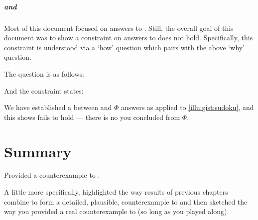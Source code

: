 \subparagraph{\qHow{} and \issueInclusion{}}


\begin{note}
  Most of this document focused on answers to \qWhy{}.
  Still, the overall goal of this document was to show a constraint on answers to \qWhy{} does not hold.
  Specifically, this constraint is understood via a `how' question which pairs with the above `why' question.

  The \qHow{} question is as follows:


  \noindent%
  And the constraint states:

\end{note}


\begin{note}
  We have established a \ros{} between \sudokuRPV{} and \(\Phi\) answers \qWhy{} as applied to \autoref{illu:gist:sudoku}, and this \ros{} shows \issueInclusion{} fails to hold --- there is no  you concluded \sudokuRPV{} from \(\Phi\).
\end{note}



\section*{Summary}
\label{sec:summary-1}

\begin{note}
  Provided a counterexample to \issueInclusion{}.

  A little more specifically, highlighted the way results of previous chapters combine to form a detailed, plausible, counterexample to \issueConstraint{} and then sketched the way you provided a real counterexample to \issueConstraint{} (so long as you played along).
\end{note}



